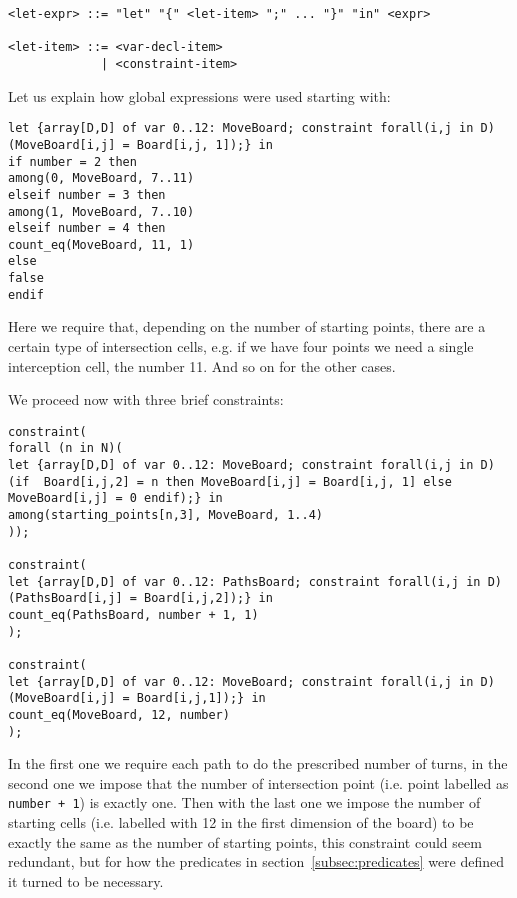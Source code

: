 \begin{verbatim}
<let-expr> ::= "let" "{" <let-item> ";" ... "}" "in" <expr>

<let-item> ::= <var-decl-item>
             | <constraint-item>
\end{verbatim}

Let us explain how global expressions were used starting with:

\begin{verbatim}
let {array[D,D] of var 0..12: MoveBoard; constraint forall(i,j in D) (MoveBoard[i,j] = Board[i,j, 1]);} in
if number = 2 then
among(0, MoveBoard, 7..11)
elseif number = 3 then
among(1, MoveBoard, 7..10)
elseif number = 4 then
count_eq(MoveBoard, 11, 1)
else
false 
endif
\end{verbatim}
Here we require that, depending on the number of starting points, there are a certain type of intersection cells, e.g. if we have four points we need a single interception cell, the number 11.
And so on for the other cases.

We proceed now with three brief constraints:
\begin{verbatim}
constraint(
forall (n in N)(
let {array[D,D] of var 0..12: MoveBoard; constraint forall(i,j in D) (if  Board[i,j,2] = n then MoveBoard[i,j] = Board[i,j, 1] else MoveBoard[i,j] = 0 endif);} in
among(starting_points[n,3], MoveBoard, 1..4)
));

constraint(
let {array[D,D] of var 0..12: PathsBoard; constraint forall(i,j in D) (PathsBoard[i,j] = Board[i,j,2]);} in
count_eq(PathsBoard, number + 1, 1)
);

constraint(
let {array[D,D] of var 0..12: MoveBoard; constraint forall(i,j in D) (MoveBoard[i,j] = Board[i,j,1]);} in
count_eq(MoveBoard, 12, number)
);
    \end{verbatim}

In the first one we require each path to do the prescribed number of turns, in the second one we impose that the number of intersection point (i.e. point labelled as \texttt{number + 1}) is exactly one. Then with the last one we impose the number of starting cells (i.e. labelled with 12 in the first dimension of the board) to be exactly the same as the number of starting points, this constraint could seem redundant, but for how the predicates in section~\ref{subsec:predicates} were defined it turned to be necessary.
